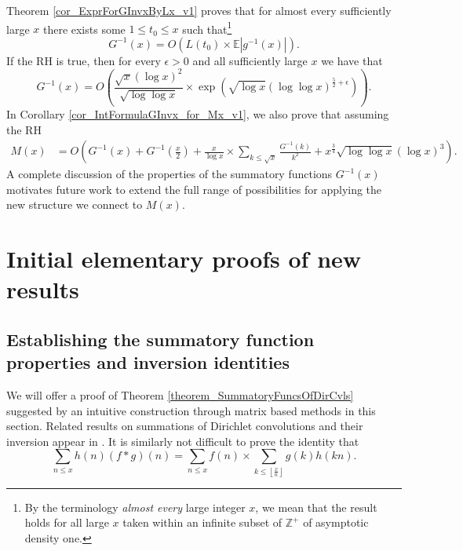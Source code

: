 \documentclass[11pt,reqno,a4letter]{article}
\numberwithin{figure}{section}
\numberwithin{table}{section}
\newcommand{\cf}{\textit{cf.\ }}
\newcommand{\Floor}[2]{\ensuremath{\left\lfloor \frac{#1}{#2} \right\rfloor}}
\theoremstyle{plain}
\numberwithin{theorem}{section}
\theoremstyle{definition}
\begin{document}
Theorem \ref{cor_ExprForGInvxByLx_v1} proves that for almost every sufficiently large $x$ 
there exists some $1 \leq t_0 \leq x$ such that\footnote{
     By the terminology 
     \emph{almost every} large integer $x$, we mean that the result holds for all large $x$ 
     taken within an infinite subset of $\mathbb{Z}^{+}$ of asymptotic density one. 
} 
\[
G^{-1}(x) = O\left(L(t_0) \times \mathbb{E}|g^{-1}(x)|\right).
\]
If the RH is true, then 
for every $\epsilon > 0$ and all sufficiently large $x$ we have that  
\[
G^{-1}(x) = O\left(\frac{\sqrt{x} (\log x)^2}{\sqrt{\log\log x}} \times \exp\left(
     \sqrt{\log x} (\log\log x)^{\frac{5}{2}+\epsilon}\right) 
     \right). 
\]
In Corollary \ref{cor_IntFormulaGInvx_for_Mx_v1}, 
we also prove that assuming the RH 
\begin{align*}
M(x) & = O\left(G^{-1}(x) + G^{-1}\left(\frac{x}{2}\right) + 
     \frac{x}{\log x} \times \sum_{k \leq \sqrt{x}} \frac{G^{-1}(k)}{k^2}
     + x^{\frac{3}{4}} \sqrt{\log\log x} (\log x)^{3}\right). 
\end{align*} 
A complete discussion of the properties of the summatory functions 
$G^{-1}(x)$ motivates future work to 
extend the full range of possibilities for applying 
the new structure we connect to $M(x)$. 

\newpage 
\section{Initial elementary proofs of new results} 
\label{Section_PrelimProofs_Config} 

\subsection{Establishing the summatory function properties and inversion identities} 
\label{subSection_PrelimProofs_Config_InversionTheorem}

We will offer a proof of Theorem \ref{theorem_SummatoryFuncsOfDirCvls} 
suggested by an intuitive construction through matrix based methods in this section. 
Related results on summations of Dirichlet convolutions and their inversion appear in 
\cite[\S 2.14; \S 3.10; \S 3.12; \cf \S 4.9, p.\ 95]{APOSTOLANUMT}. 
It is similarly not difficult to prove the identity that
\[
\sum_{n \leq x} h(n) (f \ast g)(n) = 
     \sum_{n \leq x} f(n) \times \sum_{k \leq \Floor{x}{n}} g(k) h(kn). 
\]
\end{document}
